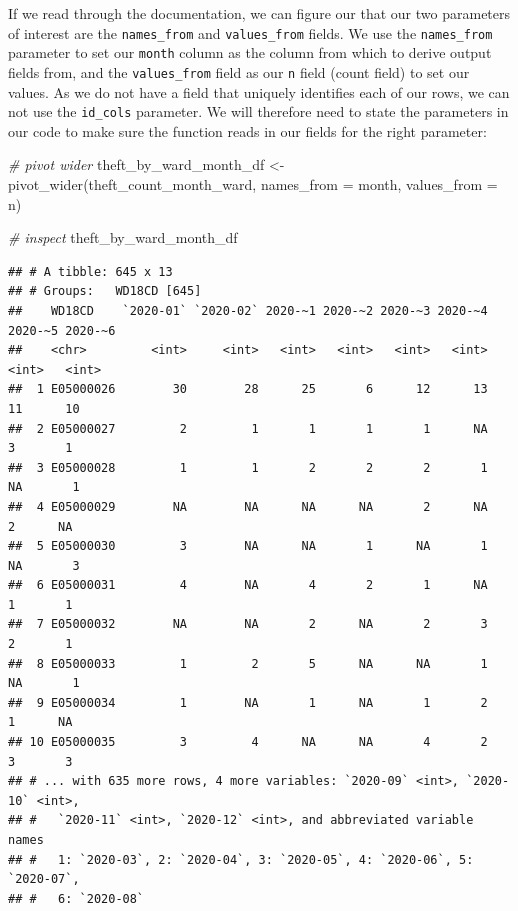 \documentclass[
]{book}
\newenvironment{Shaded}{\begin{snugshade}}{\end{snugshade}}
\newcommand{\AttributeTok}[1]{\textcolor[rgb]{0.77,0.63,0.00}{#1}}
\newcommand{\CommentTok}[1]{\textcolor[rgb]{0.56,0.35,0.01}{\textit{#1}}}
\newcommand{\FunctionTok}[1]{\textcolor[rgb]{0.00,0.00,0.00}{#1}}
\newcommand{\NormalTok}[1]{#1}
\newcommand{\OtherTok}[1]{\textcolor[rgb]{0.56,0.35,0.01}{#1}}
\begin{document}
If we read through the documentation, we can figure our that our two parameters of interest are the \texttt{names\_from} and \texttt{values\_from} fields. We use the \texttt{names\_from} parameter to set our \texttt{month} column as the column from which to derive output fields from, and the \texttt{values\_from} field as our \texttt{n} field (count field) to set our values. As we do not have a field that uniquely identifies each of our rows, we can not use the \texttt{id\_cols} parameter. We will therefore need to state the parameters in our code to make sure the function reads in our fields for the right parameter:

\begin{Shaded}
\begin{Highlighting}[]
\CommentTok{\# pivot wider}
\NormalTok{theft\_by\_ward\_month\_df }\OtherTok{\textless{}{-}} \FunctionTok{pivot\_wider}\NormalTok{(theft\_count\_month\_ward, }\AttributeTok{names\_from =}\NormalTok{ month, }\AttributeTok{values\_from =}\NormalTok{ n)}

\CommentTok{\# inspect}
\NormalTok{theft\_by\_ward\_month\_df}
\end{Highlighting}
\end{Shaded}

\begin{verbatim}
## # A tibble: 645 x 13
## # Groups:   WD18CD [645]
##    WD18CD    `2020-01` `2020-02` 2020-~1 2020-~2 2020-~3 2020-~4 2020-~5 2020-~6
##    <chr>         <int>     <int>   <int>   <int>   <int>   <int>   <int>   <int>
##  1 E05000026        30        28      25       6      12      13      11      10
##  2 E05000027         2         1       1       1       1      NA       3       1
##  3 E05000028         1         1       2       2       2       1      NA       1
##  4 E05000029        NA        NA      NA      NA       2      NA       2      NA
##  5 E05000030         3        NA      NA       1      NA       1      NA       3
##  6 E05000031         4        NA       4       2       1      NA       1       1
##  7 E05000032        NA        NA       2      NA       2       3       2       1
##  8 E05000033         1         2       5      NA      NA       1      NA       1
##  9 E05000034         1        NA       1      NA       1       2       1      NA
## 10 E05000035         3         4      NA      NA       4       2       3       3
## # ... with 635 more rows, 4 more variables: `2020-09` <int>, `2020-10` <int>,
## #   `2020-11` <int>, `2020-12` <int>, and abbreviated variable names
## #   1: `2020-03`, 2: `2020-04`, 3: `2020-05`, 4: `2020-06`, 5: `2020-07`,
## #   6: `2020-08`
\end{verbatim}
\end{document}
